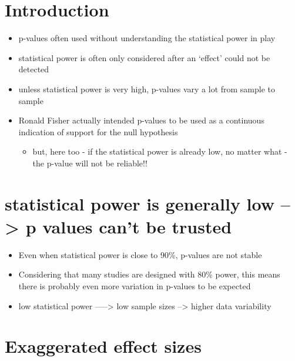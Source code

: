\documentclass[
]{book}
\providecommand{\tightlist}{%
  \setlength{\itemsep}{0pt}\setlength{\parskip}{0pt}}
\begin{document}
\hypertarget{introduction}{%
\section{Introduction}\label{introduction}}

\begin{itemize}
\tightlist
\item
  p-values often used without understanding the statistical power in play
\item
  statistical power is often only considered after an `effect' could not be detected
\item
  unless statistical power is very high, p-values vary a lot from sample to sample
\item
  Ronald Fisher actually intended p-values to be used as a continuous indication of support for the null hypothesis

  \begin{itemize}
  \tightlist
  \item
    but, here too - if the statistical power is already low, no matter what - the p-value will not be reliable!!
  \end{itemize}
\end{itemize}

\hypertarget{statistical-power-is-generally-low-p-values-cant-be-trusted}{%
\section{statistical power is generally low --\textgreater{} p values can't be trusted}\label{statistical-power-is-generally-low-p-values-cant-be-trusted}}

\begin{itemize}
\tightlist
\item
  Even when statistical power is close to 90\%, p-values are not stable
\item
  Considering that many studies are designed with 80\% power, this means there is probably even more variation in p-values to be expected
\item
  low statistical power -----\textgreater{} low sample sizes --\textgreater{} higher data variability
\end{itemize}

\hypertarget{exaggerated-effect-sizes}{%
\section{Exaggerated effect sizes}\label{exaggerated-effect-sizes}}
\end{document}
